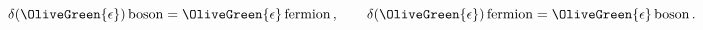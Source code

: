 \begin{equation}
  \delta (\OliveGreen{\epsilon })\,{\rm boson}=\OliveGreen{\epsilon
  }\,\textrm{fermion}\,,\qquad
\delta (\OliveGreen{\epsilon })\,{\rm fermion}=\OliveGreen{\epsilon
  }\,\textrm{boson}\,.
 \label{delbosonfermion}
\end{equation}

